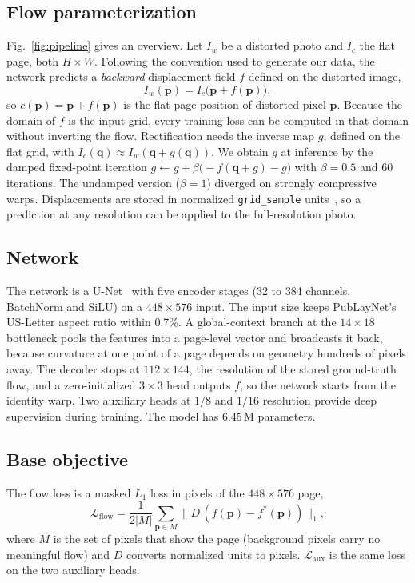 \documentclass[a4paper,fleqn]{cas-sc}
\newcommand{\Lflow}{\mathcal{L}_{\mathrm{flow}}}
\newcommand{\Laux}{\mathcal{L}_{\mathrm{aux}}}
\begin{document}
\subsection{Flow parameterization}
Fig.~\ref{fig:pipeline} gives an overview. Let $I_w$ be a distorted photo and $I_c$ the flat page, both $H\times W$. Following the convention used to generate our data, the network predicts a \emph{backward} displacement field $f$ defined on the distorted image,
\begin{equation}
I_w(\mathbf{p}) = I_c\big(\mathbf{p} + f(\mathbf{p})\big),
\label{eq:flow}
\end{equation}
so $c(\mathbf{p}) = \mathbf{p} + f(\mathbf{p})$ is the flat-page position of distorted pixel $\mathbf{p}$. Because the domain of $f$ is the input grid, every training loss can be computed in that domain without inverting the flow. Rectification needs the inverse map $g$, defined on the flat grid, with $I_c(\mathbf{q}) \approx I_w(\mathbf{q}+g(\mathbf{q}))$. We obtain $g$ at inference by the damped fixed-point iteration $g \leftarrow g + \beta\big(-f(\mathbf{q}+g) - g\big)$ with $\beta=0.5$ and 60 iterations. The undamped version ($\beta=1$) diverged on strongly compressive warps. Displacements are stored in normalized \texttt{grid\_sample} units~\cite{jaderberg2015stn}, so a prediction at any resolution can be applied to the full-resolution photo.

\subsection{Network}
The network is a U-Net~\cite{ronneberger2015unet} with five encoder stages (32 to 384 channels, BatchNorm and SiLU) on a $448\times576$ input. The input size keeps PubLayNet's US-Letter aspect ratio within 0.7\%. A global-context branch at the $14\times18$ bottleneck pools the features into a page-level vector and broadcasts it back, because curvature at one point of a page depends on geometry hundreds of pixels away. The decoder stops at $112\times144$, the resolution of the stored ground-truth flow, and a zero-initialized $3\times3$ head outputs $f$, so the network starts from the identity warp. Two auxiliary heads at $1/8$ and $1/16$ resolution provide deep supervision during training. The model has 6.45\,M parameters.

\subsection{Base objective}
The flow loss is a masked $L_1$ loss in pixels of the $448\times576$ page,
\begin{equation}
\Lflow = \frac{1}{2|M|}\sum_{\mathbf{p}\in M} \big\| D\,(f(\mathbf{p}) - f^*(\mathbf{p})) \big\|_1 ,
\end{equation}
where $M$ is the set of pixels that show the page (background pixels carry no meaningful flow) and $D$ converts normalized units to pixels. $\Laux$ is the same loss on the two auxiliary heads.
\end{document}
